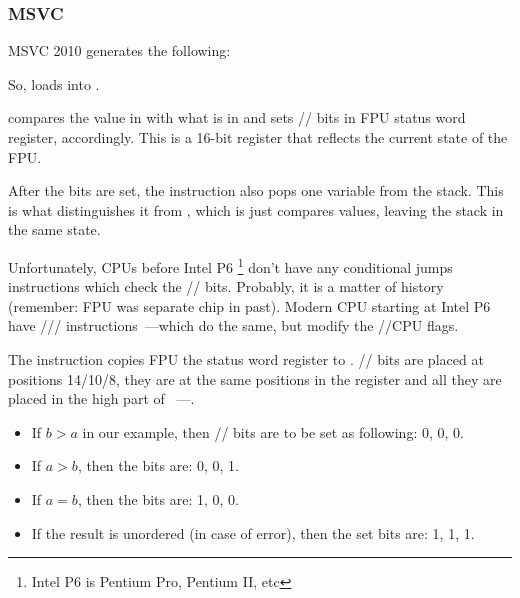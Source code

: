 \subsubsection{\NonOptimizing MSVC}

MSVC 2010 generates the following:




So, \FLD loads  into .

\label{Czero_etc}
\newcommand{\Czero}{\GTT{C0}\xspace}
\newcommand{\Ctwo}{\GTT{C2}\xspace}
\newcommand{\Cthree}{\GTT{C3}\xspace}
\newcommand{\CThreeBits}{\Cthree/\Ctwo/\Czero}


\FCOMP compares the value in  with what is in  
and sets \CThreeBits bits in FPU status word register, accordingly. 
This is a 16-bit register that reflects the current state of the FPU.

After the bits are set, the \FCOMP instruction also pops one variable from the stack. 
This is what distinguishes it from \FCOM, which is just compares values, leaving the stack in the same state.

Unfortunately, CPUs before Intel P6
\footnote{Intel P6 is Pentium Pro, Pentium II, etc} don't have any conditional 
jumps instructions which check the \CThreeBits bits. 
Probably, it is a matter of history (remember: FPU was separate chip in past).
Modern CPU starting at Intel P6 have \FCOMI/\FCOMIP/\FUCOMI/\FUCOMIP 
instructions~---which do the same, but modify the \ZF/\PF/\CF CPU flags.


The \FNSTSW instruction copies FPU the status word register to \AX. 
\CThreeBits bits are placed at positions 14/10/8, 
they are at the same positions in the \AX register and all they are placed in the high part of \AX{}~---\AH{}.

\begin{itemize}
\item If $b>a$ in our example, then \CThreeBits bits are to be set as following: 0, 0, 0.
\item If $a>b$, then the bits are: 0, 0, 1.
\item If $a=b$, then the bits are: 1, 0, 0.
\item

If the result is unordered (in case of error), then the set bits are: 1, 1, 1.
\end{itemize}

